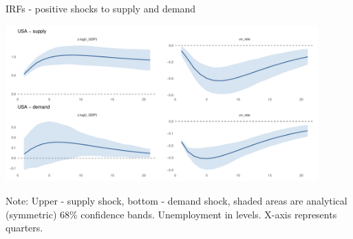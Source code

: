 \documentclass[10pt,leqno,aspectratio=169,presentation]{beamer} %
\begin{document}
\begin{frame}{IRFs - positive shocks to supply and demand}
\begin{center}
    \includegraphics[width=0.9\textwidth]{Slides/USA_IRFs.pdf}
    \vspace{0.2cm} %
    \begin{minipage}{0.85\textwidth}
    \footnotesize
    Note: Upper - supply shock, bottom - demand shock, shaded areas are analytical (symmetric) 68\% confidence bands. Unemployment in levels. X-axis represents quarters.
    \end{minipage}
\end{center}
\end{frame}
\end{document}
